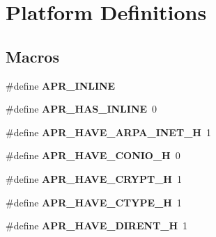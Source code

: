 \hypertarget{group__apr__platform}{\section{Platform Definitions}
\label{group__apr__platform}
}
\subsection*{Macros}
\begin{DoxyCompactItemize}
\item 
\hypertarget{group__apr__platform_gaada0f3e7bf27ea51795c2c27c20aee84}{\#define {\bfseries A\-P\-R\-\_\-\-I\-N\-L\-I\-N\-E}}\label{group__apr__platform_gaada0f3e7bf27ea51795c2c27c20aee84}

\item 
\hypertarget{group__apr__platform_ga1bfff486847c3fe487884bca79cb21fd}{\#define {\bfseries A\-P\-R\-\_\-\-H\-A\-S\-\_\-\-I\-N\-L\-I\-N\-E}~0}\label{group__apr__platform_ga1bfff486847c3fe487884bca79cb21fd}

\item 
\hypertarget{group__apr__platform_gaa6740450eabc6384924801d569e89742}{\#define {\bfseries A\-P\-R\-\_\-\-H\-A\-V\-E\-\_\-\-A\-R\-P\-A\-\_\-\-I\-N\-E\-T\-\_\-\-H}~1}\label{group__apr__platform_gaa6740450eabc6384924801d569e89742}

\item 
\hypertarget{group__apr__platform_ga24eb6d10ed0942ee4a4228df697fd5bb}{\#define {\bfseries A\-P\-R\-\_\-\-H\-A\-V\-E\-\_\-\-C\-O\-N\-I\-O\-\_\-\-H}~0}\label{group__apr__platform_ga24eb6d10ed0942ee4a4228df697fd5bb}

\item 
\hypertarget{group__apr__platform_ga38a75f33c3096b153d5302c0370e9e38}{\#define {\bfseries A\-P\-R\-\_\-\-H\-A\-V\-E\-\_\-\-C\-R\-Y\-P\-T\-\_\-\-H}~1}\label{group__apr__platform_ga38a75f33c3096b153d5302c0370e9e38}

\item 
\hypertarget{group__apr__platform_gad0fe0c5bffd8073cb57178ceb9761933}{\#define {\bfseries A\-P\-R\-\_\-\-H\-A\-V\-E\-\_\-\-C\-T\-Y\-P\-E\-\_\-\-H}~1}\label{group__apr__platform_gad0fe0c5bffd8073cb57178ceb9761933}

\item 
\hypertarget{group__apr__platform_ga87b424528fd6448c5aabc6cc61024c9a}{\#define {\bfseries A\-P\-R\-\_\-\-H\-A\-V\-E\-\_\-\-D\-I\-R\-E\-N\-T\-\_\-\-H}~1}\label{group__apr__platform_ga87b424528fd6448c5aabc6cc61024c9a}


\end{DoxyCompactItemize}
